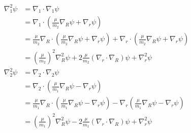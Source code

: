 \documentclass{article}
\begin{document}
\begin{enumerate}
        \begin{align*}
          \nabla_1^2 \psi & = \nabla_1 \cdot \nabla_1 \psi                                                                                                                                              \\
                          & = \nabla_1 \cdot \left( \frac{\mu}{m_2} \nabla_R \psi + \nabla_r \psi \right)                                                                                               \\
                          & = \frac{\mu}{m_2} \nabla_R \cdot \left( \frac{\mu}{m_2} \nabla_R \psi + \nabla_r \psi \right) + \nabla_r \cdot \left( \frac{\mu}{m_2} \nabla_R \psi + \nabla_r \psi \right) \\
                          & = \left( \frac{\mu}{m_2} \right)^2 \nabla_R^2 \psi + 2 \frac{\mu}{m_2} (\nabla_r \cdot \nabla_R) \psi + \nabla_r^2 \psi                                                     \\
          \nabla_2^2 \psi & = \nabla_2 \cdot \nabla_2 \psi                                                                                                                                              \\
                          & = \nabla_2 \cdot \left( \frac{\mu}{m_1} \nabla_R \psi - \nabla_r \psi \right)                                                                                               \\
                          & = \frac{\mu}{m_1} \nabla_R \cdot \left( \frac{\mu}{m_1} \nabla_R \psi - \nabla_r \psi \right) - \nabla_r \left( \frac{\mu}{m_1} \nabla_R \psi - \nabla_r \psi \right)       \\
                          & = \left( \frac{\mu}{m_1} \right)^2 \nabla_R^2 \psi - 2 \frac{\mu}{m_1} (\nabla_r \cdot \nabla_R) \psi + \nabla_r^2 \psi
        \end{align*}


\end{enumerate}
\end{document}

